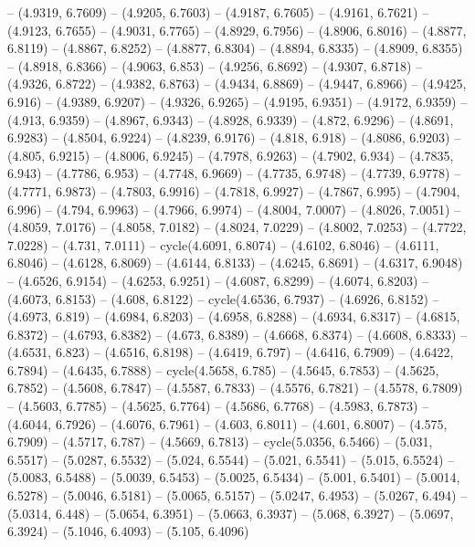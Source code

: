 {  -- (4.9319, 6.7609) -- (4.9205, 6.7603) -- (4.9187, 6.7605) -- (4.9161, 
  6.7621) -- (4.9123, 6.7655) -- (4.9031, 6.7765) -- (4.8929, 6.7956) -- 
  (4.8906, 6.8016) -- (4.8877, 6.8119) -- (4.8867, 6.8252) -- (4.8877, 6.8304) 
  -- (4.8894, 6.8335) -- (4.8909, 6.8355) -- (4.8918, 6.8366) -- (4.9063, 6.853)
   -- (4.9256, 6.8692) -- (4.9307, 6.8718) -- (4.9326, 6.8722) -- (4.9382, 
  6.8763) -- (4.9434, 6.8869) -- (4.9447, 6.8966) -- (4.9425, 6.916) -- (4.9389,
   6.9207) -- (4.9326, 6.9265) -- (4.9195, 6.9351) -- (4.9172, 6.9359) -- 
  (4.913, 6.9359) -- (4.8967, 6.9343) -- (4.8928, 6.9339) -- (4.872, 6.9296) -- 
  (4.8691, 6.9283) -- (4.8504, 6.9224) -- (4.8239, 6.9176) -- (4.818, 6.918) -- 
  (4.8086, 6.9203) -- (4.805, 6.9215) -- (4.8006, 6.9245) -- (4.7978, 6.9263) --
   (4.7902, 6.934) -- (4.7835, 6.943) -- (4.7786, 6.953) -- (4.7748, 6.9669) -- 
  (4.7735, 6.9748) -- (4.7739, 6.9778) -- (4.7771, 6.9873) -- (4.7803, 6.9916) 
  -- (4.7818, 6.9927) -- (4.7867, 6.995) -- (4.7904, 6.996) -- (4.794, 6.9963) 
  -- (4.7966, 6.9974) -- (4.8004, 7.0007) -- (4.8026, 7.0051) -- (4.8059, 
  7.0176) -- (4.8058, 7.0182) -- (4.8024, 7.0229) -- (4.8002, 7.0253) -- 
  (4.7722, 7.0228) -- (4.731, 7.0111) -- cycle(4.6091, 6.8074) -- (4.6102, 
  6.8046) -- (4.6111, 6.8046) -- (4.6128, 6.8069) -- (4.6144, 6.8133) -- 
  (4.6245, 6.8691) -- (4.6317, 6.9048) -- (4.6526, 6.9154) -- (4.6253, 6.9251) 
  -- (4.6087, 6.8299) -- (4.6074, 6.8203) -- (4.6073, 6.8153) -- (4.608, 6.8122)
   -- cycle(4.6536, 6.7937) -- (4.6926, 6.8152) -- (4.6973, 6.819) -- (4.6984, 
  6.8203) -- (4.6958, 6.8288) -- (4.6934, 6.8317) -- (4.6815, 6.8372) -- 
  (4.6793, 6.8382) -- (4.673, 6.8389) -- (4.6668, 6.8374) -- (4.6608, 6.8333) --
   (4.6531, 6.823) -- (4.6516, 6.8198) -- (4.6419, 6.797) -- (4.6416, 6.7909) --
   (4.6422, 6.7894) -- (4.6435, 6.7888) -- cycle(4.5658, 6.785) -- (4.5645, 
  6.7853) -- (4.5625, 6.7852) -- (4.5608, 6.7847) -- (4.5587, 6.7833) -- 
  (4.5576, 6.7821) -- (4.5578, 6.7809) -- (4.5603, 6.7785) -- (4.5625, 6.7764) 
  -- (4.5686, 6.7768) -- (4.5983, 6.7873) -- (4.6044, 6.7926) -- (4.6076, 
  6.7961) -- (4.603, 6.8011) -- (4.601, 6.8007) -- (4.575, 6.7909) -- (4.5717, 
  6.787) -- (4.5669, 6.7813) -- cycle(5.0356, 6.5466) -- (5.031, 6.5517) -- 
  (5.0287, 6.5532) -- (5.024, 6.5544) -- (5.021, 6.5541) -- (5.015, 6.5524) -- 
  (5.0083, 6.5488) -- (5.0039, 6.5453) -- (5.0025, 6.5434) -- (5.001, 6.5401) --
   (5.0014, 6.5278) -- (5.0046, 6.5181) -- (5.0065, 6.5157) -- (5.0247, 6.4953) 
  -- (5.0267, 6.494) -- (5.0314, 6.448) -- (5.0654, 6.3951) -- (5.0663, 6.3937) 
  -- (5.068, 6.3927) -- (5.0697, 6.3924) -- (5.1046, 6.4093) -- (5.105, 6.4096) 
}
